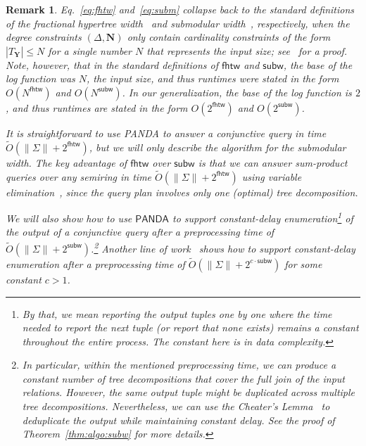 \documentclass[10pt,a4paper]{article}
\newtheorem{remark}{Remark}[section]
\newcommand{\norm}[1]{\|#1\|}
\newcommand{\panda}{\textsf{PANDA}\xspace}
\newcommand{\fhtw}{\textsf{fhtw}}
\newcommand{\subm}{\textsf{subw}}
\begin{document}
\begin{remark}
Eq.~\eqref{eq:fhtw} and~\eqref{eq:subm} collapse back to the standard definitions of the fractional
hypertree width~\cite{DBLP:journals/talg/GroheM14} and submodular width~\cite{DBLP:journals/jacm/Marx13}, respectively, when the degree constraints $(\Delta, \bm N)$
only contain cardinality constraints of the form $|T_{\bm Y}| \leq N$ for a single number $N$ that represents the input size;
see~\cite{DBLP:conf/pods/Khamis0S17} for a proof.
Note, however, that in the standard definitions of $\fhtw$ and $\subm$,
the base of the log function was $N$, the input size, and thus runtimes were stated in the form
$O(N^{\fhtw})$ and $O(N^{\subm})$.  In our generalization, the base of the log function is
$2$, and thus runtimes are stated in the form $O(2^{\fhtw})$ and $O(2^{\subm})$.

It is straightforward to use \panda to answer a conjunctive query in time $\tilde
O(\norm{\Sigma}+ 2^{\fhtw})$, but we will only describe the algorithm for the
submodular width. The key advantage of $\fhtw$ over $\subm$ is that we can answer sum-product
queries over any semiring in time $\tilde O(\norm{\Sigma}+ 2^{\fhtw})$ using variable
elimination~\cite{DBLP:conf/pods/KhamisNR16}, since the query plan involves only {\em one}
(optimal) tree decomposition.

We will also show how to use $\panda$ to support {\em constant-delay enumeration}\footnote{By that, we mean reporting the output tuples one by one
where the time needed to report the next tuple (or report that none exists) remains a constant
throughout the entire process. The constant here is in {\em data complexity}.} of the output of a conjunctive query
after a preprocessing time of $\tilde O(\norm{\Sigma}+ 2^{\subm})$.\footnote{In particular, within the mentioned preprocessing time,
    we can produce a constant number of tree decompositions
    that cover the full join of the input relations.
    However, the same output tuple might be duplicated across multiple tree decompositions.
    Nevertheless, we can use the {\em Cheater's Lemma}~\cite{10.1145/3450263} to deduplicate
    the output while maintaining constant delay. See the proof of Theorem~\ref{thm:algo:subw} for more details.
}
Another line of work~\cite{berkholz_et_al:LIPIcs.MFCS.2019.58} shows how to support constant-delay enumeration after a preprocessing time of $\tilde O(\norm{\Sigma}+ 2^{c\cdot\subm})$
for some constant $c > 1$.
\end{remark}
\end{document}
